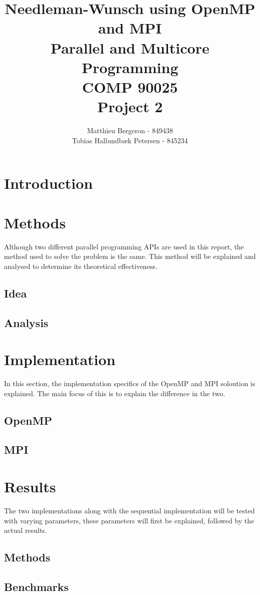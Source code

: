 \documentclass[a4paper]{article}
\title{Needleman-Wunsch using OpenMP and MPI\\Parallel and Multicore Programming\\COMP 90025\\Project 2}
\author{Matthieu Bergeron - 849438\\Tobias Hallundbæk Petersen - 845234}
\begin{document}
\maketitle
\section{Introduction}

\section{Methods}
Although two different parallel programming APIs are used in this report, the method used to solve the problem is the same. This method will be explained and analysed to determine its theoretical effectiveness.
\subsection{Idea}

\subsection{Analysis}

\section{Implementation}
In this section, the implementation specifics of the OpenMP and MPI soloution is explained. The main focus of this is to explain the difference in the two.
\subsection{OpenMP}

\subsection{MPI}

\section{Results}
The two implementations along with the sequential implementation will be tested with varying parameters, these parameters will first be explained, followed by the actual results.
\subsection{Methods}

\subsection{Benchmarks}

\end{document}
